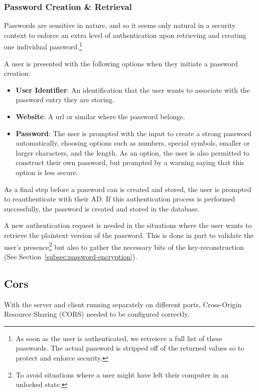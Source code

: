 \subsubsection{Password Creation \& Retrieval}\label{subsubsec:creation-and-retrieval}
Passwords are sensitive in nature, and so it seems only natural in a security
context to enforce an extra level of authentication upon retrieving and
creating one individual password.\footnote{
  As soon as the user is authenticated, we retreieve a full list of these
  passwords.
  The actual password is stripped off of the returned values so to protect
  and enforce security.
}

A user is presented with the following options when they initiate a password
creation:

\begin{itemize}
  \item \textbf{User Identifier}: An identification that the user wants to
  associate with the password entry they are storing.
  \item \textbf{Website}: A url or similar where the password belongs.
  \item \textbf{Password}: The user is prompted with the input to create a
  strong password automatically, choosing options such as numbers, special
  symbols, smaller or larger characters, and the length.
  As an option, the user is also permitted to construct their own password,
  but prompted by a warning saying that this option is less secure.
\end{itemize}

As a final step before a password can is created and stored, the user is
prompted to reauthenticate with their AD\@.
If this authentication process is performed successfully, the password is
created and stored in the database.

A new authentication request is needed in the situations where the user wants to
retrieve the plaintext version of the password.
This is done in part to validate the user's presence\footnote{
  To avoid situations where a user might have left their computer in an
  unlocked state.
} but also to gather the necessary bits of the key-reconstruction (See
Section~\ref{subsec:password-encryption}).

\subsection{Cors}\label{subsec:cors}
With the server and client running separately on different ports, Cross-Origin
Resource Sharing (CORS) needed to be configured correctly.


